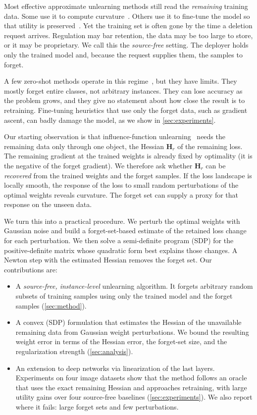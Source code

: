 \documentclass[10pt,twocolumn,letterpaper]{article}
\newcommand{\Hr}{\mathbf{H}_r}
\begin{document}
Most effective approximate unlearning methods still read the \emph{remaining} training data. Some use it to compute curvature~\cite{guo2020certified,golatkar2020eternal,mehta2022deep}. Others use it to fine-tune the model so that utility is preserved~\cite{kurmanji2023towards}. Yet the training set is often gone by the time a deletion request arrives. Regulation may bar retention, the data may be too large to store, or it may be proprietary. We call this the \emph{source-free} setting. The deployer holds only the trained model and, because the request supplies them, the samples to forget.

A few zero-shot methods operate in this regime~\cite{chundawat2023zero,foster2024zero}, but they have limits. They mostly forget entire classes, not arbitrary instances. They can lose accuracy as the problem grows, and they give no statement about how close the result is to retraining. Fine-tuning heuristics that use only the forget data, such as gradient ascent, can badly damage the model, as we show in \cref{sec:experiments}.

Our starting observation is that influence-function unlearning~\cite{koh2017understanding,guo2020certified} needs the remaining data only through one object, the Hessian $\Hr$ of the remaining loss. The remaining gradient at the trained weights is already fixed by optimality (it is the negative of the forget gradient). We therefore ask whether $\Hr$ can be \emph{recovered} from the trained weights and the forget samples. If the loss landscape is locally smooth, the response of the loss to small random perturbations of the optimal weights reveals curvature. The forget set can supply a proxy for that response on the unseen data.

We turn this into a practical procedure. We perturb the optimal weights with Gaussian noise and build a forget-set-based estimate of the retained loss change for each perturbation. We then solve a semi-definite program (SDP) for the positive-definite matrix whose quadratic form best explains those changes. A Newton step with the estimated Hessian removes the forget set. Our contributions are:
\begin{itemize}
  \item A \emph{source-free, instance-level} unlearning algorithm. It forgets arbitrary random subsets of training samples using only the trained model and the forget samples (\cref{sec:method}).
  \item A convex (SDP) formulation that estimates the Hessian of the unavailable remaining data from Gaussian weight perturbations. We bound the resulting weight error in terms of the Hessian error, the forget-set size, and the regularization strength (\cref{sec:analysis}).
  \item An extension to deep networks via linearization of the last layers. Experiments on four image datasets show that the method follows an oracle that uses the exact remaining Hessian and approaches retraining, with large utility gains over four source-free baselines (\cref{sec:experiments}). We also report where it fails: large forget sets and few perturbations.
\end{itemize}
\end{document}
